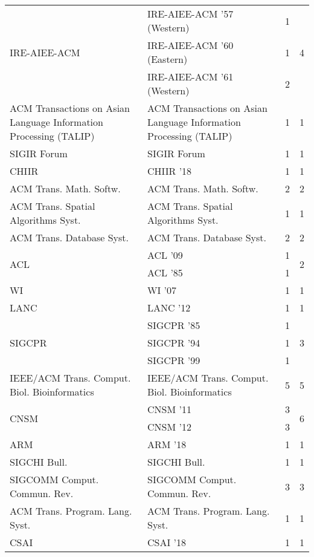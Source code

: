 \begin{table*}[t]
\begin{tabular}{llrr}
\multirow{3}{*}{IRE-AIEE-ACM } & IRE-AIEE-ACM '57 (Western) & 1 & \multirow{3}{*}{4}\\
& IRE-AIEE-ACM '60 (Eastern) & 1 &\\
& IRE-AIEE-ACM '61 (Western) & 2 &\\
\multirow{1}{*}{ACM Transactions on Asian Language Information Processing (TALIP)} & ACM Transactions on Asian Language Information Processing (TALIP) & 1 & \multirow{1}{*}{1}\\
\multirow{1}{*}{SIGIR Forum} & SIGIR Forum & 1 & \multirow{1}{*}{1}\\
\multirow{1}{*}{CHIIR } & CHIIR '18 & 1 & \multirow{1}{*}{1}\\
\multirow{1}{*}{ACM Trans. Math. Softw.} & ACM Trans. Math. Softw. & 2 & \multirow{1}{*}{2}\\
\multirow{1}{*}{ACM Trans. Spatial Algorithms Syst.} & ACM Trans. Spatial Algorithms Syst. & 1 & \multirow{1}{*}{1}\\
\multirow{1}{*}{ACM Trans. Database Syst.} & ACM Trans. Database Syst. & 2 & \multirow{1}{*}{2}\\
\multirow{2}{*}{ACL } & ACL '09 & 1 & \multirow{2}{*}{2}\\
& ACL '85 & 1 &\\
\multirow{1}{*}{WI } & WI '07 & 1 & \multirow{1}{*}{1}\\
\multirow{1}{*}{LANC } & LANC '12 & 1 & \multirow{1}{*}{1}\\
\multirow{3}{*}{SIGCPR } & SIGCPR '85 & 1 & \multirow{3}{*}{3}\\
& SIGCPR '94 & 1 &\\
& SIGCPR '99 & 1 &\\
\multirow{1}{*}{IEEE/ACM Trans. Comput. Biol. Bioinformatics} & IEEE/ACM Trans. Comput. Biol. Bioinformatics & 5 & \multirow{1}{*}{5}\\
\multirow{2}{*}{CNSM } & CNSM '11 & 3 & \multirow{2}{*}{6}\\
& CNSM '12 & 3 &\\
\multirow{1}{*}{ARM } & ARM '18 & 1 & \multirow{1}{*}{1}\\
\multirow{1}{*}{SIGCHI Bull.} & SIGCHI Bull. & 1 & \multirow{1}{*}{1}\\
\multirow{1}{*}{SIGCOMM Comput. Commun. Rev.} & SIGCOMM Comput. Commun. Rev. & 3 & \multirow{1}{*}{3}\\
\multirow{1}{*}{ACM Trans. Program. Lang. Syst.} & ACM Trans. Program. Lang. Syst. & 1 & \multirow{1}{*}{1}\\
\multirow{1}{*}{CSAI } & CSAI '18 & 1 & \multirow{1}{*}{1}\\

\end{tabular}
\end{table*}
